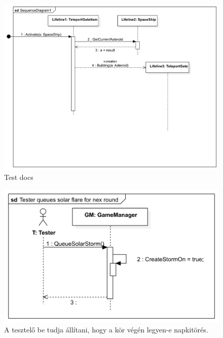 \begin{figure}[H] 
\centering 
\includegraphics[width=1\textwidth]{docs/img/svg/Skeleton!Place gate!Interaction1!SequenceDiagram1_41.png} 
\caption{Test docs
} 
\end{figure} 

\begin{figure}[H] 
\centering 
\includegraphics[width=1\textwidth]{docs/img/svg/Skeleton!Solar flare!Interaction1!Tester queues solar flare for nex round_34.png} 
\caption{A tesztelő be tudja állítani, hogy a kör végén legyen-e napkitörés.} 
\end{figure} 

